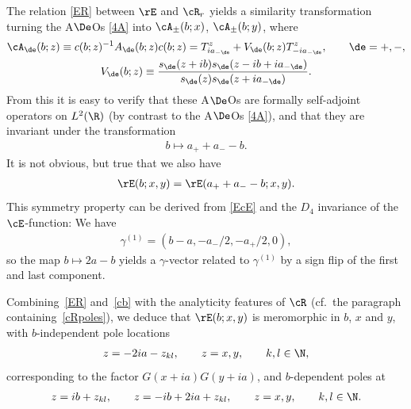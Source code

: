 \documentclass[pdftex]{sigma}
\numberwithin{equation}{section}
\begin{document}
The relation \eqref{ER} between $\rE$ and $\cR_r$ yields a similarity transformation turning the A$\De$Os \eqref{4A} into $\cA_{\pm}(b;x)$, $\cA_{\pm}(b;y)$,
where
\begin{gather}\label{cAdef}
\cA_{\de}(b;z)\equiv c(b;z)^{-1}A_{\de}(b;z)c(b;z)=T^z_{ia_{-\de}}+V_{\de}(b;z)T^z_{-ia_{-\de}},\qquad \de=+,-,
\\
V_{\de}(b;z)\equiv \frac{s_{\de}(z+ib)s_{\de}(z-ib +ia_{-\de})}{s_{\de}(z)s_{\de}(z+ia_{-\de})}.
\end{gather}
From this it is easy to verify that these A$\De$Os are formally self-adjoint operators on $L^2(\R)$ (by contrast to the A$\De$Os \eqref{4A}), and that they are invariant under the transformation
\begin{gather}\label{bsym}
b \mapsto a_{+}+a_{-}-b.
\end{gather}
It is not obvious, but true that we also have
\begin{gather}\label{Esym}
\rE(b;x,y)=\rE(a_{+}+a_{-}-b;x,y).
\end{gather}
This symmetry property can be derived from \eqref{EcE} and the $D_4$ invariance of the $\cE$-function: We have
\begin{gather}\label{gam1}
\gamma^{(1)}=(b-a,-a_{-}/2,-a_{+}/2,0),
\end{gather}
so the map $b\mapsto 2a-b$ yields a $\gamma$-vector related to $\gamma^{(1)}$ by a sign f\/lip of the f\/irst and last component.

Combining~\eqref{ER} and~\eqref{cb} with the analyticity features of $\cR$ (cf.~the paragraph con\-taining~\eqref{cRpoles}), we deduce that $\rE(b;x,y)$ is meromorphic in $b$, $x$ and $y$, with $b$-independent pole locations
\begin{gather}
z=-2ia-z_{kl},\qquad z=x,y,\qquad k,l\in\N,
\end{gather}
corresponding to the factor $G(x+ia)G(y+ia)$, and $b$-dependent poles at
\begin{gather}
z=ib+z_{kl},\qquad z=-ib+2ia+z_{kl},\qquad z=x,y,\qquad k,l\in\N.
\end{gather}
\end{document}
